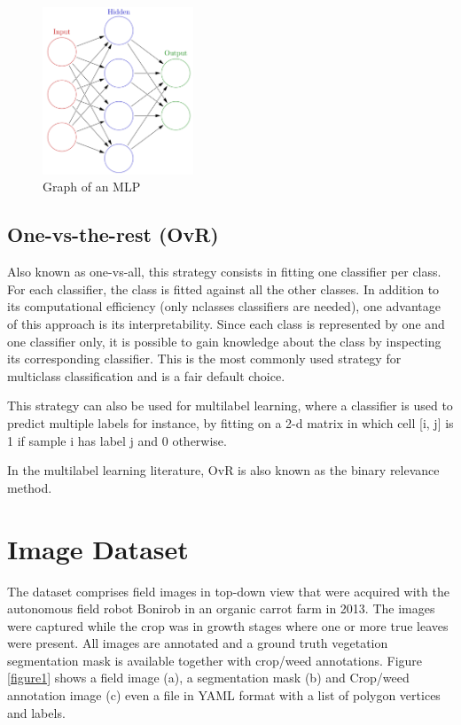 \documentclass[12pt]{article}
\numberwithin{equation}{section}
\numberwithin{table}{section}
\numberwithin{figure}{section}
\begin{document}
\begin{figure}[H] \centering
	\includegraphics[width=0.4\textwidth]{mlp.png}
	\caption{Graph of an MLP }
	\label{mlpg}
\end{figure}




\subsection{One-vs-the-rest (OvR) } \label{ovr}

Also known as one-vs-all, this strategy consists in fitting one classifier per class. For each classifier, the class is fitted against all the other classes. In addition to its computational efficiency (only nclasses classifiers are needed), one advantage of this approach is its interpretability. Since each class is represented by one and one classifier only, it is possible to gain knowledge about the class by inspecting its corresponding classifier. This is the most commonly used strategy for multiclass classification and is a fair default choice.

This strategy can also be used for multilabel learning, where a classifier is used to predict multiple labels for instance, by fitting on a 2-d matrix in which cell [i, j] is 1 if sample i has label j and 0 otherwise.

In the multilabel learning literature, OvR is also known as the binary relevance method.





\section{Image Dataset}

The dataset comprises field images in top-down view that were acquired with the autonomous field robot Bonirob\cite{BOSH} in an organic carrot farm in 2013. The images were captured while the crop was in growth stages where one or more true leaves were present. All images are annotated and a ground truth vegetation segmentation mask is available together with crop/weed annotations. Figure \ref{figure1} shows a field image (a), a segmentation mask (b) and Crop/weed annotation image (c) even a file in YAML format with a list of polygon vertices and labels.
\end{document}
